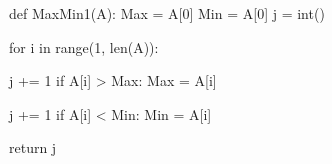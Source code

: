 \begin{python}
def MaxMin1(A):
	Max = A[0]
	Min = A[0]
	j = int()
	
	for i in range(1, len(A)):
	
		j += 1 %
		if A[i] > Max:
		Max = A[i]
		
		j += 1 %
		if A[i] < Min:
		Min = A[i]
	
	return j 

\end{python}
		